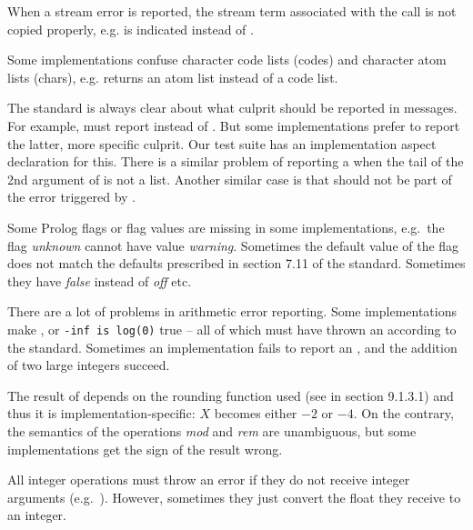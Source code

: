 \documentclass[draft]{llncs}%
\begin{document}
When a stream error is reported, the stream term associated with the call is
not copied properly, e.g.  is indicated instead of
.

Some implementations confuse character code lists (codes) and character atom
lists (chars), e.g.  returns an atom
list instead of a code list.

The standard is always clear about what culprit should be reported in
 messages. For example,
 must report
 instead of
. But some implementations
prefer to report the latter, more specific culprit. Our test suite has an
implementation aspect declaration for this. There is a similar problem of
reporting a  when the tail
of the 2nd argument of  is not a list.
Another similar case is that  should not be part of the error
triggered by .

Some Prolog flags or flag values are missing in some implementations, e.g.\
the flag \textsl{unknown} cannot have value \textsl{warning}. Sometimes the
default value of the flag does not match the defaults prescribed in section
7.11 of the standard.
Sometimes they have \textsl{false} instead of \textsl{off} etc.

There are a lot of problems in arithmetic error reporting. Some implementations
make \texttx{+inf is 1/0}, \texttx{nan is sqrt(-1)} or \texttt{-inf is
log(0)} true -- all of which must have thrown an
 according to the standard.
Sometimes an implementation fails to report an
, and the addition of two large
integers succeed.

The result of  depends on the rounding function
used (see in section 9.1.3.1) and thus it is implementation-specific: $X$
becomes either $-2$ or $-4$. On the contrary, the
semantics of the operations \textsl{mod} and \textsl{rem} are unambiguous, 
but some implementations get the sign of the result wrong.

All integer operations must throw an error if they do not receive integer
arguments (e.g.\ \texttx{X is 1.0>>2}). However, sometimes they just convert
the float they receive to an integer.
\end{document}
